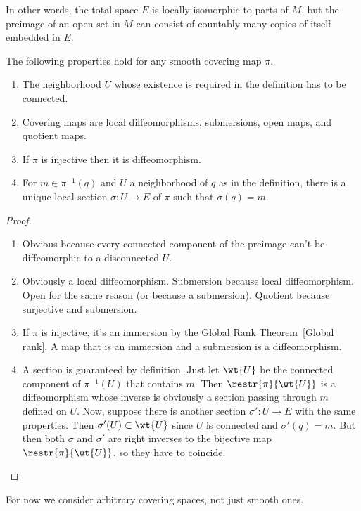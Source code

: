 In other words, the total space $E$ is locally isomorphic to parts of $M$, but the preimage of an open set in $M$ can consist of countably many copies of itself embedded in $E$.

\begin{prop}The following properties hold for any smooth covering map $\pi$.
\begin{enumerate}
    \item The neighborhood $U$ whose existence is required in the definition has to be connected.
    \item Covering maps are local diffeomorphisms, submersions, open maps, and quotient maps.
    \item If $\pi $ is injective then it is diffeomorphism.
    \item For $m\in \pi^{-1}(q)$ and $U$ a neighborhood of $q$ as in the definition, there is a unique local section $\sigma:U\to E$ of $\pi$ such that $\sigma(q)=m$.
\end{enumerate}
\end{prop}
\begin{proof}
\begin{enumerate}
    \item Obvious because every connected component of the preimage can't be diffeomorphic to a disconnected $U$.
    \item Obviously a local diffeomorphism. Submersion because local diffeomorphism. Open for the same reason (or because a submersion). Quotient because surjective and submersion.
    \item If $\pi$ is injective, it's an immersion by the Global Rank Theorem~\ref{Global rank}. A map that is an immersion and a submersion is a diffeomorphism.
    \item A section is guaranteed by definition. Just let $\wt{U}$ be the connected component of $\pi^{-1}(U)$ that contains $m$. Then $\restr{\pi}{\wt{U}}$ is a diffeomorphism whose inverse is obviously a section passing through $m$ defined on $U$. Now, suppose there is another section $\sigma':U\to E$ with the same properties. Then $\sigma'(U)\subset \wt{U}$ since $U$ is connected and $\sigma'(q)=m$. But then both $\sigma$ and $\sigma'$ are right inverses to the bijective map $\restr{\pi}{\wt{U}}$, so they have to coincide.
\end{enumerate}
\end{proof}

For now we consider arbitrary covering spaces, not just smooth ones.


